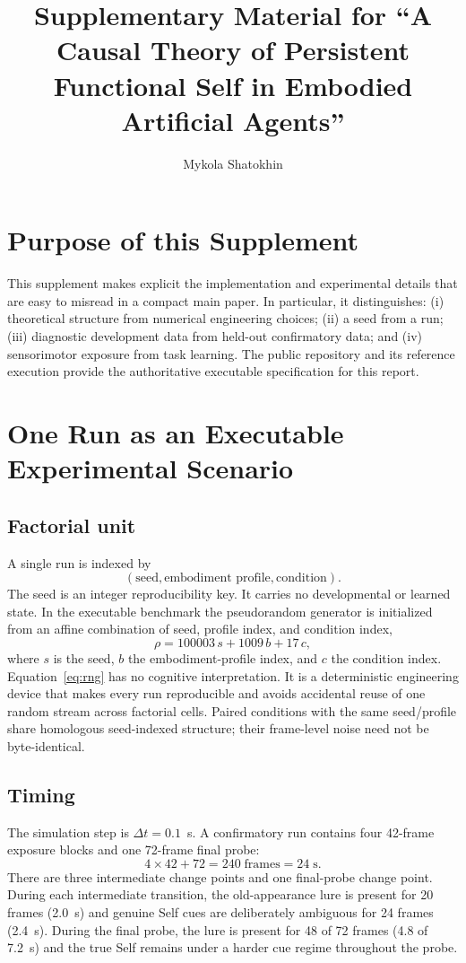 \documentclass[10pt,journal,onecolumn]{IEEEtran}
\title{Supplementary Material for ``A Causal Theory of Persistent Functional Self in Embodied Artificial Agents''}
\author{Mykola Shatokhin}
\begin{document}
\maketitle

\section{Purpose of this Supplement}
This supplement makes explicit the implementation and experimental details that are easy to misread in a compact main paper. In particular, it distinguishes: (i) theoretical structure from numerical engineering choices; (ii) a seed from a run; (iii) diagnostic development data from held-out confirmatory data; and (iv) sensorimotor exposure from task learning. The public repository and its reference execution provide the authoritative executable specification for this report.

\section{One Run as an Executable Experimental Scenario}
\subsection{Factorial unit}
A single run is indexed by
\begin{equation}
(\text{seed},\text{embodiment profile},\text{condition}).
\end{equation}
The seed is an integer reproducibility key. It carries no developmental or learned state. In the executable benchmark the pseudorandom generator is initialized from an affine combination of seed, profile index, and condition index,
\begin{equation}
\rho=100003\,s+1009\,b+17\,c,
\label{eq:rng}
\end{equation}
where $s$ is the seed, $b$ the embodiment-profile index, and $c$ the condition index. Equation~\eqref{eq:rng} has no cognitive interpretation. It is a deterministic engineering device that makes every run reproducible and avoids accidental reuse of one random stream across factorial cells. Paired conditions with the same seed/profile share homologous seed-indexed structure; their frame-level noise need not be byte-identical.

\subsection{Timing}
The simulation step is $\Delta t=0.1$~s. A confirmatory run contains four 42-frame exposure blocks and one 72-frame final probe:
\begin{equation}
4\times42+72=240\;\text{frames}=24\;\text{s}.
\end{equation}
There are three intermediate change points and one final-probe change point. During each intermediate transition, the old-appearance lure is present for 20 frames (2.0~s) and genuine Self cues are deliberately ambiguous for 24 frames (2.4~s). During the final probe, the lure is present for 48 of 72 frames (4.8 of 7.2~s) and the true Self remains under a harder cue regime throughout the probe.
\end{document}
